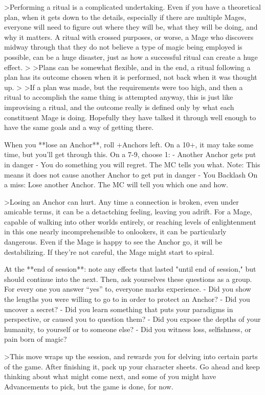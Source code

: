 \documentclass[
  oneside,
  statementpaper,
  9pt]{memoir}
\begin{document}
\begin{Player}
>Performing a ritual is a complicated undertaking. Even if you have a theoretical plan, when it gets down to the details, especially if there are multiple Mages, everyone will need to figure out where they will be, what they will be doing, and why it matters. A ritual with crossed purposes, or worse, a Mage who discovers midway through that they do not believe a type of magic being employed is possible, can be a huge disaster, just as how a successful ritual can create a huge effect.
>
>Plans can be somewhat flexible, and in the end, a ritual following a plan has its outcome chosen when it is performed, not back when it was thought up.
>
>If a plan was made, but the requirements were too high, and then a ritual to accomplish the same thing is attempted anyway, this is just like improvising a ritual, and the outcome really is defined only by what each constituent Mage is doing. Hopefully they have talked it through well enough to have the same goals and a way of getting there.

When you **lose an Anchor**, roll +Anchors left. On a 10+, it may take some time, but you’ll get through this. On a 7-9, choose 1:
- Another Anchor gets put in danger
- You do something you will regret. The MC tells you what. Note: This means it does not cause another Anchor to get put in danger
- You Backlash 
On a miss: Lose another Anchor. The MC will tell you which one and how.

>Losing an Anchor can hurt. Any time a connection is broken, even under amicable terms, it can be a detactching feeling, leaving you adrift. For a Mage, capable of walking into other worlds entirely, or reaching levels of enlightenment in this one nearly incomprehensible to onlookers, it can be particularly dangerous. Even if the Mage is happy to see the Anchor go, it will be destabilizing. If they’re not careful, the Mage might start to spiral.

At the **end of session**: note any effects that lasted "until end of session," but should continue into the next. Then, ask yourselves these questions as a group. For every one you answer “yes” to, everyone marks experience.
- Did you show the lengths you were willing to go to in order to protect an Anchor?  
- Did you uncover a secret?  
- Did you learn something that puts your paradigms in perspective, or caused you to question them?  
- Did you expose the depths of your humanity, to yourself or to someone else?  
- Did you witness loss, selfishness, or pain born of magic?

>This move wraps up the session, and rewards you for delving into certain parts of the game. After finishing it, pack up your character sheets. Go ahead and keep thinking about what might come next, and some of you might have Advancements to pick, but the game is done, for now.


\end{Player}
\end{document}
